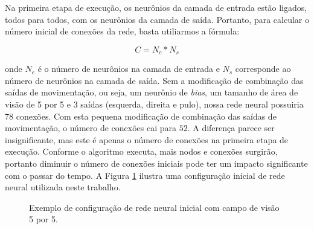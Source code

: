 Na primeira etapa de execução, os neurônios da camada de entrada estão ligados,
todos para todos, com os neurônios da camada de saída. Portanto, para calcular o
número inicial de conexões da rede, basta utiliarmos a fórmula:

\begin{equation}
	\label{eq:network-connections}
	C = N_e * N_s
\end{equation}

onde $N_e$ é o número de neurônios na camada de entrada e $N_s$ corresponde ao
número de neurônios na camada de saída. Sem a modificação de combinação das
saídas de movimentação, ou seja, um neurônio de \textit{bias}, um tamanho de
área de visão de 5 por 5 e 3 saídas (esquerda, direita e pulo), nossa rede
neural possuiria $78$ conexões.  Com esta pequena modificação de combinação das
saídas de movimentação, o número de conexões cai para $52$. A diferença parece
ser insignificante, mas este é apenas o número de conexões na primeira etapa de
execução. Conforme o algoritmo executa, mais nodos e conexões surgirão, portanto
diminuir o número de conexões iniciais pode ter um impacto significante com o
passar do tempo. A Figura \ref{fig:modelling-network-example} ilustra uma
configuração inicial de rede neural utilizada neste trabalho.

\begin{figure}[H]
\centering
{}
\caption {\label{fig:modelling-network-example}Exemplo de configuração de rede
	neural inicial com campo de visão 5 por 5.}
\end{figure}

